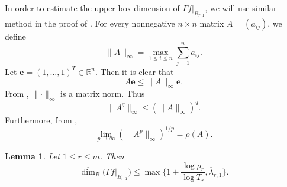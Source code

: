 \documentclass[11pt]{amsart}
\newtheorem{lem}[thm]{Lemma}
\theoremstyle{definition}
\theoremstyle{remark}
\numberwithin{equation}{section}
\newcommand{\bR}{{\mathbb R}}
\newcommand{\bfe}{{\mathbf e}}
\newcommand{\blue}{\color{blue}}
\newcommand{\upM}{{\overline{M}}}
\newcommand{\uplam}{{\overline{\lambda}}}
\newcommand{\uprho}{{{\rho}}}
\def\updimB{\overline{\dim}_B}
\begin{document}

In order to estimate the upper box dimension of $\Gamma f|_{B_{r,1}}$, we will use similar method in the proof of \cite[Theorem~4.6]{JR24}.
For every nonnegative $n \times n$ matrix $A=(a_{ij})$, we define 
$$\|A\|_\infty=\max_{1\leq i\leq n} \sum_{j=1}^n a_{ij}.$$
Let $\bfe=(1,\ldots,1)^T\in \bR^{n}$. Then it is clear that 
\begin{equation}\label{eq:4.13}
	A \bfe \leq \|A\|_\infty \bfe.
\end{equation}
From \cite[Example 5.6.5]{HJ13}, $\lVert \cdot \rVert_\infty$ is a matrix norm. Thus
\begin{equation}\label{eq:4.14}
	\|A^q\|_\infty\leq (\|A\|_\infty)^q.
\end{equation}
Furthermore, from \cite[Corollary 5.6.14]{HJ13}, 
\begin{equation}\label{eq:4.15}
	\lim_{p\to\infty} (\rVert A^p\|_\infty)^{1/p}=\rho(A).
\end{equation}










\begin{lem}\label{thm:box-dim-up-sc}
	Let $1 \leq r \leq m$. Then
	\begin{equation}\label{eq:4.16}
		\updimB \big(\Gamma f|_{B_{r,1}}\big) \leq\max\Big\{ 1+ \frac{\log  \uprho_r }{ \log T_r}, \uplam_{r,1} \Big\}.
	\end{equation}
\end{lem}
\end{document}
